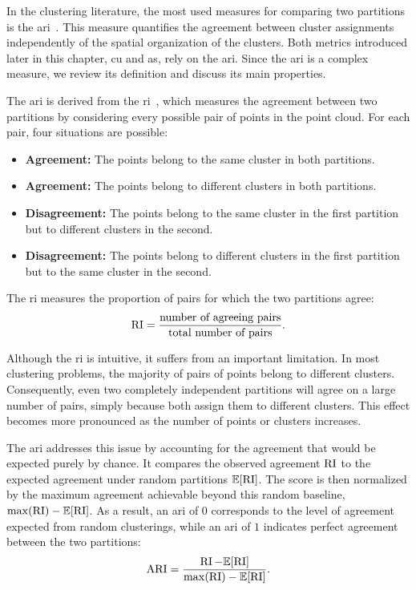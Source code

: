 In the clustering literature, the most used measures for comparing two partitions is the \gls{ari}~\parencite{hubert1985comparing}.
This measure quantifies the agreement between cluster assignments independently of the spatial organization of the clusters.
Both metrics introduced later in this chapter, \gls{cu} and \gls{as}, rely on the \gls{ari}.
Since the \gls{ari} is a complex measure, we review its definition and discuss its main properties.

The \gls{ari} is derived from the \gls{ri}~\parencite{rand1971objective}, which measures the agreement between two partitions by considering every possible pair of points in the point cloud.
For each pair, four situations are possible:
\begin{itemize}
\item \textbf{Agreement:} The points belong to the same cluster in both partitions.
\item \textbf{Agreement:} The points belong to different clusters in both partitions.
\item \textbf{Disagreement:} The points belong to the same cluster in the first partition but to different clusters in the second.
\item \textbf{Disagreement:} The points belong to different clusters in the first partition but to the same cluster in the second.
\end{itemize}

The \gls{ri} measures the proportion of pairs for which the two partitions agree:
\[
\operatorname{RI} = \frac{\text{number of agreeing pairs}}{\text{total number of pairs}}.
\]

Although the \gls{ri} is intuitive, it suffers from an important limitation.
In most clustering problems, the majority of pairs of points belong to different clusters.
Consequently, even two completely independent partitions will agree on a large number of pairs, simply because both assign them to different clusters.
This effect becomes more pronounced as the number of points or clusters increases.

The \gls{ari} addresses this issue by accounting for the agreement that would be expected purely by chance.
It compares the observed agreement $\operatorname{RI}$ to the expected agreement under random partitions $\mathbb{E}[\operatorname{RI}]$.
The score is then normalized by the maximum agreement achievable beyond this random baseline, $\max(\operatorname{RI}) - \mathbb{E}[\operatorname{RI}]$.
As a result, an \gls{ari} of $0$ corresponds to the level of agreement expected from random clusterings, while an \gls{ari} of $1$ indicates perfect agreement between the two partitions:
\[
\operatorname{ARI} = \frac{\operatorname{RI} - \mathbb{E}[\operatorname{RI}]}{\max(\operatorname{RI}) - \mathbb{E}[\operatorname{RI}]}.
\]

